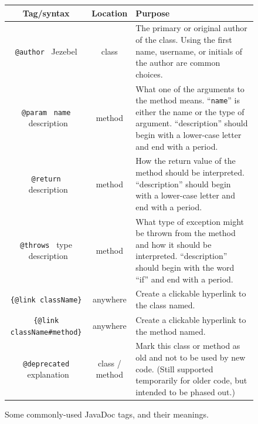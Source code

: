 \begin{figure}[ht]
\centering
\scriptsize
\begin{tabularx}{\textwidth}{|c|c|X|}
\hline
Tag/syntax & Location & Purpose\\

\hline
\hline

\index{author tag@\texttt{"@author} tag}
\texttt{@author} \ Jezebel & class & 
The primary or original author of the class. Using the first name, username, or
initials of the author are common choices.\\

\hline

\index{param tag@\texttt{"@param} tag}
\texttt{@param} \ \texttt{name} \ description & method & 
What one of the arguments to the method means.
``\texttt{name}'' is either the name or the type of argument.
``description'' should begin with a lower-case letter
and end with a period.\\

\hline

\index{return tag@\texttt{"@return} tag}
\texttt{@return} \ description & method & 
How the return value of the method should be
interpreted. ``description'' should begin with a
lower-case letter and end with a period.\\

\hline

\index{throws tag@\texttt{"@throws} tag}
\texttt{@throws} \ type \ description & method & 
What type of exception might be thrown from the
method and how it should be interpreted.
``description'' should begin with the word ``if'' and
end with a period.\\

\hline
\index{link tag@\texttt{"@link} tag}
\texttt{\{@link className\}} & anywhere &
Create a clickable hyperlink to the class named.\\

\hline

\texttt{\{@link className\#method\}} & anywhere &
Create a clickable hyperlink to the method named.\\

\hline

\index{deprecated tag@\texttt{"@deprecated} tag}
\texttt{@deprecated} \ explanation &
\makecell{class / \\ method} & 
Mark this class or method as old and not to be used
by new code. (Still supported temporarily for older
code, but intended to be phased out.)\\

\hline

\end{tabularx}
\vspace{.1in}
\caption{Some commonly-used JavaDoc tags, and their meanings.}
\label{fig:taglist}
\end{figure}
\normalsize

